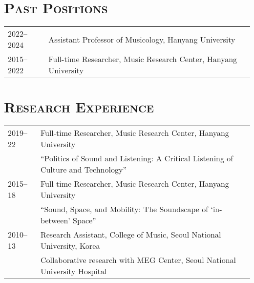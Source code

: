 \documentclass[a4paper,11pt,draft]{article}
\begin{document}
  \vspace{2.5mm}
  
  \section*{\textsc{Past Positions}}
  
  \hspace*{-0.25cm}
  \begin{tabular}{p{2.5cm} l}
    2022--2024 & Assistant Professor of Musicology, Hanyang University\\
    2015--2022 & Full-time Researcher, Music Research Center, Hanyang
    University
  \end{tabular}
  
  \vspace*{5mm}
  
  \section*{\textsc{Research Experience}}
  
  \hspace*{-0.25cm}
  \begin{tabular}{p{2.5cm} l}
    2019--22 & Full-time Researcher, Music Research Center, Hanyang
    University\\
    & ``Politics of Sound and Listening: A Critical Listening of Culture and
    Technology''\\
    2015--18 & Full-time Researcher, Music Research Center, Hanyang University\\
    & ``Sound, Space, and Mobility: The Soundscape of ‘in-between’ Space''\\
    2010--13 & Research Assistant, College of Music, Seoul National University,
    Korea\\
    & Collaborative research with MEG Center, Seoul National University
    Hospital
  \end{tabular}
  
  \vspace*{5mm}
  
\end{document}
